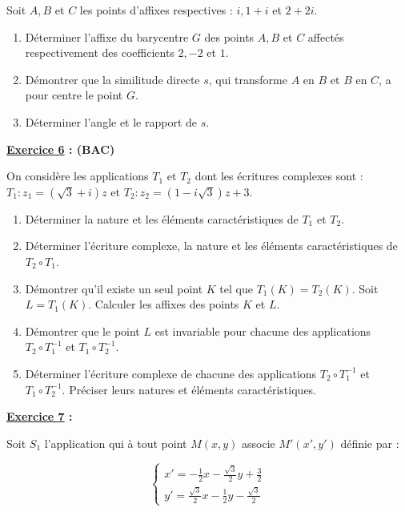 \documentclass[12pt,a4paper]{article}
\begin{document}
\bigskip

Soit \( A, B \) et \( C \) les points d’affixes respectives :  
\( i, 1 + i \) et \( 2 + 2i \).

\begin{enumerate}
    \item Déterminer l’affixe du barycentre \( G \) des points \( A, B \) et \( C \) affectés respectivement des coefficients \( 2, -2 \) et \( 1 \).
    \item Démontrer que la similitude directe \( s \), qui transforme \( A \) en \( B \) et \( B \) en \( C \), a pour centre le point \( G \).
    \item Déterminer l’angle et le rapport de \( s \).
\end{enumerate}

\textbf{\underline{Exercice 6} : (BAC)}

\bigskip

On considère les applications \( T_1 \) et \( T_2 \) dont les écritures complexes sont :  
\( T_1 : z_1 = (\sqrt{3} + i)z \) et \( T_2 : z_2 = (1 - i\sqrt{3})z + 3 \).

\begin{enumerate}
    \item Déterminer la nature et les éléments caractéristiques de \( T_1 \) et \( T_2 \).
    \item Déterminer l’écriture complexe, la nature et les éléments caractéristiques de \( T_2 \circ T_1 \).
    \item Démontrer qu’il existe un seul point \( K \) tel que \( T_1(K) = T_2(K) \). Soit \( L = T_1(K) \).  
          Calculer les affixes des points \( K \) et \( L \).
    \item Démontrer que le point \( L \) est invariable pour chacune des applications \( T_2 \circ T_1^{-1} \) et \( T_1 \circ T_2^{-1} \).
    \item Déterminer l’écriture complexe de chacune des applications \( T_2 \circ T_1^{-1} \) et \( T_1 \circ T_2^{-1} \).  
          Préciser leurs natures et éléments caractéristiques.
\end{enumerate}

\bigskip

\textbf{\underline{Exercice 7} :}

\bigskip

Soit \( S_1 \) l’application qui à tout point \( M(x,y) \) associe \( M'(x',y') \) définie par :

\[
\begin{cases}
    x' = -\frac{1}{2}x - \frac{\sqrt{3}}{2}y + \frac{3}{2} \\
    y' = \frac{\sqrt{3}}{2}x - \frac{1}{2}y - \frac{\sqrt{3}}{2}
\end{cases}
\]
\end{document}
